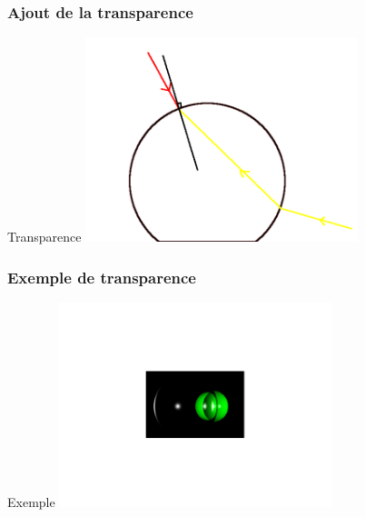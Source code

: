 \begin{frame}
	\frametitle{Ajout de la transparence}
	\begin{block}{Transparence}
		\includegraphics[width = 300px]{transparence.png} 
	\end{block}
\end{frame}

\begin{frame}
	\frametitle{Exemple de transparence}
	\begin{block}{Exemple}
		\includegraphics[width = 300px]{Untitled.png} 
	\end{block}
\end{frame}
